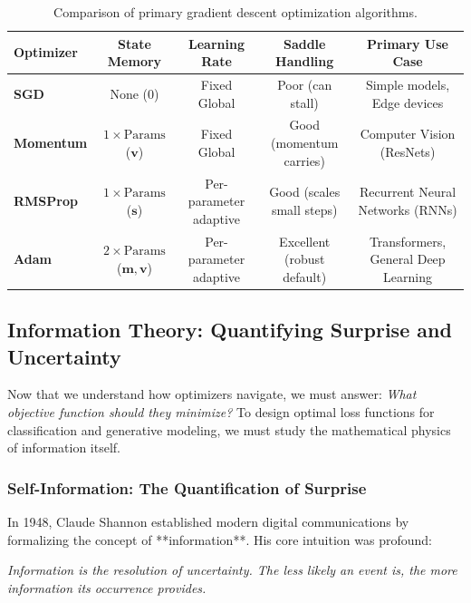 \begin{table}[htbp]
\centering
\caption{Comparison of primary gradient descent optimization algorithms.}\label{tab:optimizer_summary}
\small
\begin{tabular}{lcccc}
\toprule
\textbf{Optimizer} & \textbf{State Memory} & \textbf{Learning Rate} & \textbf{Saddle Handling} & \textbf{Primary Use Case} \\
\midrule
\textbf{SGD} & None ($0$) & Fixed Global & Poor (can stall) & Simple models, Edge devices \\
\textbf{Momentum} & $1 \times \text{Params}$ ($\mathbf{v}$) & Fixed Global & Good (momentum carries) & Computer Vision (ResNets) \\
\textbf{RMSProp} & $1 \times \text{Params}$ ($\mathbf{s}$) & Per-parameter adaptive & Good (scales small steps) & Recurrent Neural Networks (RNNs) \\
\textbf{Adam} & $2 \times \text{Params}$ ($\mathbf{m}, \mathbf{v}$) & Per-parameter adaptive & Excellent (robust default) & Transformers, General Deep Learning \\
\bottomrule
\end{tabular}
\end{table}

\subsection{Information Theory: Quantifying Surprise and Uncertainty}\label{subsec:opt_information_theory}

Now that we understand how optimizers navigate, we must answer: \textit{What objective function should they minimize?} To design optimal loss functions for classification and generative modeling, we must study the mathematical physics of information itself.

\subsubsection{Self-Information: The Quantification of Surprise}
In 1948, Claude Shannon established modern digital communications by formalizing the concept of **information**. His core intuition was profound:
\begin{center}
\textit{Information is the resolution of uncertainty. The less likely an event is, the more information its occurrence provides.}
\end{center}

